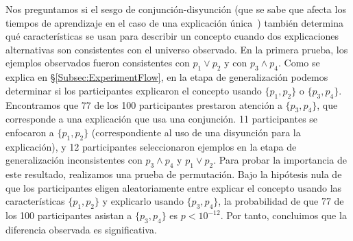 Nos preguntamos si el sesgo de conjunción-disyunción (que se sabe que afecta los tiempos de aprendizaje en el caso de una explicación única~\cite{bourne1970knowing}) también determina qué características se usan para describir un concepto cuando dos explicaciones alternativas son consistentes con el universo observado. En la primera prueba, los ejemplos observados fueron consistentes con $ p_1 \vee p_2 $ y con $ p_3 \wedge p_4 $. Como se explica en \S\ref{Subsec:ExperimentFlow}, en la etapa de generalización podemos determinar si los participantes explicaron el concepto usando $ \{p_1, p_2 \} $ o $ \{p_3, p_4 \} $. Encontramos que 77 de los 100 participantes prestaron atención a $ \{p_3, p_4 \} $, que corresponde a una explicación que usa una conjunción. 11 participantes se enfocaron a $ \{p_1, p_2 \} $ (correspondiente al uso de una disyunción para la explicación), y 12 participantes seleccionaron ejemplos en la etapa de generalización inconsistentes con $ p_3 \wedge p_4 $ y $ p_1 \vee p_2$. Para probar la importancia de este resultado, realizamos una prueba de permutación. Bajo la hipótesis nula de que los participantes eligen aleatoriamente entre explicar el concepto usando las características $ \{p_1, p_2 \} $ y explicarlo usando $ \{p_3, p_4 \} $, la probabilidad de que 77 de los 100 participantes asistan a $ \{ p_3, p_4 \} $ es $ p <10^{-12} $. Por tanto, concluimos que la diferencia observada es significativa.

